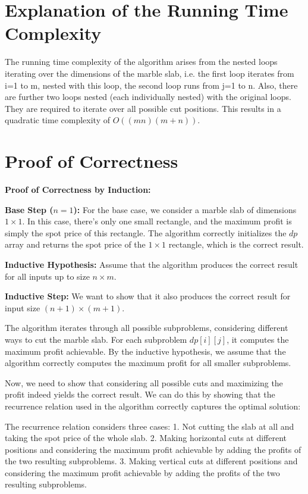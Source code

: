\documentclass{article}
\begin{document}
\section{Explanation of the Running Time Complexity}
    The running time complexity of the algorithm arises from the nested loops iterating over the dimensions of the marble slab, i.e. the first loop iterates from i=1 to m, nested with this loop, the second loop runs from j=1 to n. Also, there are further two loops nested (each individually nested) with the original loops. They are required to iterate over all possible cut positions. This results in a quadratic time complexity of $O((mn)(m + n))$.


\section{Proof of Correctness}

    \textbf{Proof of Correctness by Induction:}

    \textbf{Base Step ($n = 1$):}
    For the base case, we consider a marble slab of dimensions $1 \times 1$. In this case, there's only one small rectangle, and the maximum profit is simply the spot price of this rectangle. The algorithm correctly initializes the $dp$ array and returns the spot price of the $1 \times 1$ rectangle, which is the correct result.

    \textbf{Inductive Hypothesis:}
    Assume that the algorithm produces the correct result for all inputs up to size $n \times m$.
    
    \textbf{Inductive Step:}
    We want to show that it also produces the correct result for input size $(n+1) \times (m+1)$.
    
    The algorithm iterates through all possible subproblems, considering different ways to cut the marble slab. For each subproblem $dp[i][j]$, it computes the maximum profit achievable. By the inductive hypothesis, we assume that the algorithm correctly computes the maximum profit for all smaller subproblems.
    
    Now, we need to show that considering all possible cuts and maximizing the profit indeed yields the correct result. We can do this by showing that the recurrence relation used in the algorithm correctly captures the optimal solution:
    
    The recurrence relation considers three cases:
    1. Not cutting the slab at all and taking the spot price of the whole slab.
    2. Making horizontal cuts at different positions and considering the maximum profit achievable by adding the profits of the two resulting subproblems.
    3. Making vertical cuts at different positions and considering the maximum profit achievable by adding the profits of the two resulting subproblems.
\end{document}
